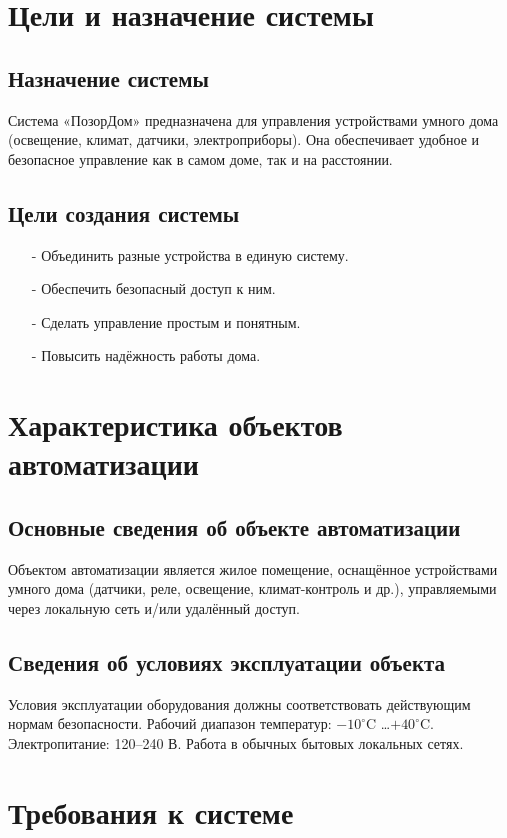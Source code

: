 \documentclass[oneside,a4paper,14pt]{extarticle}
\begin{document}
\section{Цели и назначение системы}

\subsection{Назначение системы}
Система «ПозорДом» предназначена для управления устройствами умного дома (освещение, климат, датчики, электроприборы). Она обеспечивает удобное и безопасное управление как в самом доме, так и на расстоянии.

\subsection{Цели создания системы}
\begin{itemize}
    \item[-] Объединить разные устройства в единую систему.
    \item[-] Обеспечить безопасный доступ к ним.
    \item[-] Сделать управление простым и понятным.
    \item[-] Повысить надёжность работы дома.
\end{itemize}

\section{Характеристика объектов автоматизации}

\subsection{Основные сведения об объекте автоматизации}
Объектом автоматизации является жилое помещение, оснащённое устройствами умного дома (датчики, реле, освещение, климат-контроль и др.), управляемыми через локальную сеть и/или удалённый доступ.

\subsection{Сведения об условиях эксплуатации объекта}
Условия эксплуатации оборудования должны соответствовать действующим нормам безопасности.
Рабочий диапазон температур: $-10^\circ$C \dots $+40^\circ$C.
Электропитание: 120–240 В.
Работа в обычных бытовых локальных сетях.

\section{Требования к системе}
\end{document}
